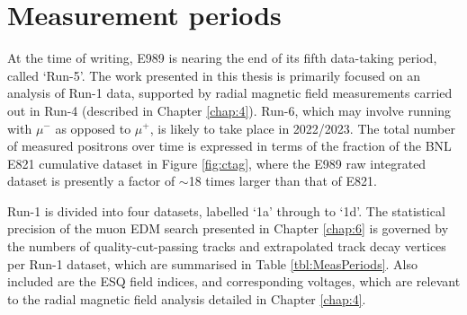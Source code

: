 







\section{Measurement periods}\label{sec:MeasPeriods}

At the time of writing, E989 is nearing the end of its fifth data-taking period, called `Run-5'. The work presented in this thesis is primarily focused on an analysis of Run-1 data, supported by radial magnetic field measurements carried out in Run-4 (described in Chapter \ref{chap:4}). Run-6, which may involve running with $\mu^{-}$ as opposed to $\mu^{+}$, is likely to take place in 2022/2023. The total number of measured positrons over time is expressed in terms of the fraction of the BNL E821 cumulative dataset in Figure \ref{fig:ctag}, where the E989 raw integrated dataset is presently a factor of $\sim$18 times larger than that of E821. 

Run-1 is divided into four datasets, labelled `1a' through to `1d'. The statistical precision of the muon EDM search presented in Chapter \ref{chap:6} is governed by the numbers of quality-cut-passing tracks and extrapolated track decay vertices per Run-1 dataset, which are summarised in Table \ref{tbl:MeasPeriods}. Also included are the ESQ field indices, and corresponding voltages, which are relevant to the radial magnetic field analysis detailed in Chapter \ref{chap:4}. 

